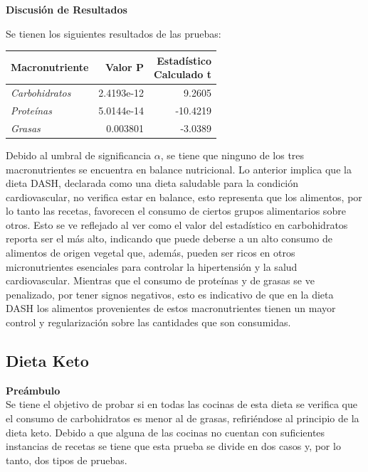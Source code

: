 \documentclass[12pt,a4paper]{article}
\begin{document}
        \textbf{Discusión de Resultados}\\
        {
            Se tienen los siguientes resultados de las pruebas:

            \begin{center}    
                \begin{tabular}{lrr}
                    \toprule
                        \textbf{Macronutriente} & \textbf{Valor P} & \makecell{\textbf{Estadístico}\\\textbf{Calculado t}} \\
                    \midrule
                        \emph{Carbohidratos} & 2.4193e-12 &   9.2605 \\
                        \emph{Proteínas}     & 5.0144e-14 & -10.4219 \\
                        \emph{Grasas}        & 0.003801   &  -3.0389 \\
                    \bottomrule
                \end{tabular}
            \end{center}

            Debido al umbral de significancia $\alpha$, se tiene que ninguno 
            de los tres macronutrientes se encuentra en balance nutricional. 
            Lo anterior implica que la dieta DASH, declarada como una dieta 
            saludable para la condición cardiovascular, no verifica estar en 
            balance, esto representa que los alimentos, por lo tanto las recetas, 
            favorecen el consumo de ciertos grupos alimentarios sobre otros. 
            Esto se ve reflejado al ver como el valor del estadístico en 
            carbohidratos reporta ser el más alto, indicando que puede deberse 
            a un alto consumo de alimentos de origen vegetal que, además, pueden 
            ser ricos en otros micronutrientes esenciales para controlar la 
            hipertensión y la salud cardiovascular. Mientras que el consumo de 
            proteínas y de grasas se ve penalizado, por tener signos negativos, 
            esto es indicativo de que en la dieta DASH los alimentos provenientes de 
            estos macronutrientes tienen un mayor control y regularización sobre 
            las cantidades que son consumidas.
        }

    \subsection{Dieta Keto}
        \textbf{Preámbulo}\\
        {
            Se tiene el objetivo de probar si en todas las cocinas de esta dieta 
            se verifica que el consumo de carbohidratos es menor al de grasas, 
            refiriéndose al principio de la dieta keto. Debido a que alguna de las cocinas no cuentan 
            con suficientes instancias de recetas se tiene que esta prueba se 
            divide en dos casos y, por lo tanto, dos tipos de pruebas.\\
        }
\end{document}
